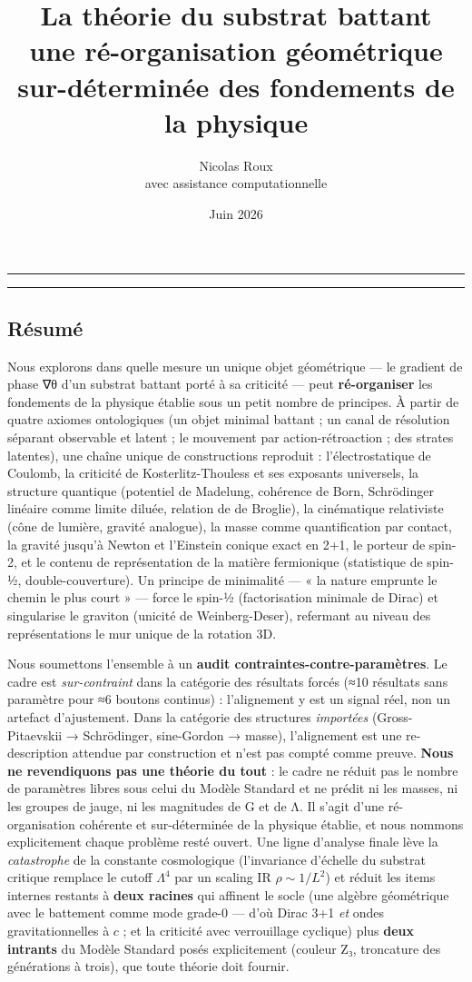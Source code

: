 \documentclass[11pt]{article}
\title{\textbf{La théorie du substrat battant}\\[0.3em]\large une ré-organisation géométrique sur-déterminée des fondements de la physique}
\author{Nicolas Roux\\\small avec assistance computationnelle}
\date{Juin 2026}
\begin{document}
\maketitle
\noindent\rule{\textwidth}{0.4pt}
\tableofcontents
\vspace{1em}\noindent\rule{\textwidth}{0.4pt}

\hypertarget{ruxe9sumuxe9}{%
\subsection{Résumé}\label{ruxe9sumuxe9}}

Nous explorons dans quelle mesure un unique objet géométrique --- le
gradient de phase ∇θ d'un substrat battant porté à sa criticité --- peut
\textbf{ré-organiser} les fondements de la physique établie sous un
petit nombre de principes. À partir de quatre axiomes ontologiques (un
objet minimal battant ; un canal de résolution séparant observable et
latent ; le mouvement par action-rétroaction ; des strates latentes),
une chaîne unique de constructions reproduit : l'électrostatique de
Coulomb, la criticité de Kosterlitz-Thouless et ses exposants
universels, la structure quantique (potentiel de Madelung, cohérence de
Born, Schrödinger linéaire comme limite diluée, relation de de Broglie),
la cinématique relativiste (cône de lumière, gravité analogue), la masse
comme quantification par contact, la gravité jusqu'à Newton et
l'Einstein conique exact en 2+1, le porteur de spin-2, et le contenu de
représentation de la matière fermionique (statistique de spin-½,
double-couverture). Un principe de minimalité --- « la nature emprunte
le chemin le plus court » --- force le spin-½ (factorisation minimale de
Dirac) et singularise le graviton (unicité de Weinberg-Deser), refermant
au niveau des représentations le mur unique de la rotation 3D.

Nous soumettons l'ensemble à un \textbf{audit
contraintes-contre-paramètres}. Le cadre est \emph{sur-contraint} dans
la catégorie des résultats forcés (≈10 résultats sans paramètre pour ≈6
boutons continus) : l'alignement y est un signal réel, non un artefact
d'ajustement. Dans la catégorie des structures \emph{importées}
(Gross-Pitaevskii → Schrödinger, sine-Gordon → masse), l'alignement est
une re-description attendue par construction et n'est pas compté comme
preuve. \textbf{Nous ne revendiquons pas une théorie du tout} : le cadre
ne réduit pas le nombre de paramètres libres sous celui du Modèle
Standard et ne prédit ni les masses, ni les groupes de jauge, ni les
magnitudes de G et de Λ. Il s'agit d'une ré-organisation cohérente et
sur-déterminée de la physique établie, et nous nommons explicitement
chaque problème resté ouvert. Une ligne d'analyse finale lève la
\emph{catastrophe} de la constante cosmologique (l'invariance d'échelle
du substrat critique remplace le cutoff \(\Lambda^4\) par un scaling IR
\(\rho\sim 1/L^2\)) et réduit les items internes restants à \textbf{deux
racines} qui affinent le socle (une algèbre géométrique avec le
battement comme mode grade-0 --- d'où Dirac 3+1 \emph{et} ondes
gravitationnelles à \(c\) ; et la criticité avec verrouillage cyclique)
plus \textbf{deux intrants} du Modèle Standard posés explicitement
(couleur Z₃, troncature des générations à trois), que toute théorie doit
fournir.
\end{document}

